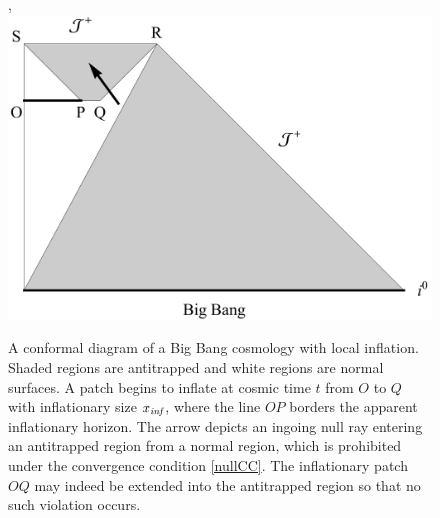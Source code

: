 \begin{figure}[h]\cite{Vachaspati:1998dy},\cite{Berera:2000xz}
\centering
\includegraphics[scale=0.4]{bigbang.pdf}
\caption{A conformal diagram of a Big Bang cosmology with local inflation. Shaded regions are antitrapped and white regions are normal surfaces. A patch begins to inflate at cosmic time $t$ from $O$ to $Q$ with inflationary size $x_{\text {\it inf}}$, where the line $OP$ borders the apparent inflationary horizon. The arrow depicts an ingoing null ray entering an antitrapped region from a normal region, which is prohibited under the convergence condition \eqref{nullCC}. The inflationary patch $OQ$ may indeed be extended into the antitrapped region so that no such violation occurs.}\label{bigbang} 
\end{figure}


